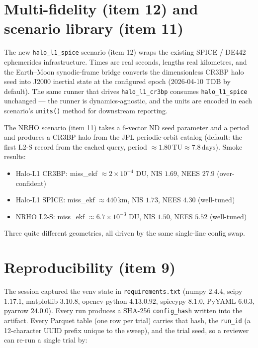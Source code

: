 \documentclass[11pt]{article}
\begin{document}
\section{Multi-fidelity (item 12) and scenario library (item 11)}

The new \texttt{halo\_l1\_spice} scenario (item 12) wraps the existing
SPICE / DE442 ephemerides infrastructure. Times are real seconds, lengths
real kilometres, and the Earth--Moon synodic-frame bridge converts the
dimensionless CR3BP halo seed into J2000 inertial state at the configured
epoch (2026-04-10 TDB by default). The same runner that drives
\texttt{halo\_l1\_cr3bp} consumes \texttt{halo\_l1\_spice} unchanged ---
the runner is dynamics-agnostic, and the units are encoded in each
scenario's \texttt{units()} method for downstream reporting.

The NRHO scenario (item 11) takes a 6-vector ND seed parameter and a
period and produces a CR3BP halo from the JPL periodic-orbit catalog
(default: the first L2-S record from the cached query, period
$\approx 1.80\,\textrm{TU} \approx 7.8\,\textrm{days}$). Smoke results:

\begin{itemize}[leftmargin=2em]
\item Halo-L1 CR3BP: miss\_ekf $\approx 2 \times 10^{-4}$ DU, NIS $1.69$, NEES $27.9$ (over-confident)
\item Halo-L1 SPICE: miss\_ekf $\approx 440\,\textrm{km}$, NIS $1.73$, NEES $4.30$ (well-tuned)
\item NRHO L2-S: miss\_ekf $\approx 6.7 \times 10^{-3}$ DU, NIS $1.50$, NEES $5.52$ (well-tuned)
\end{itemize}

\noindent
Three quite different geometries, all driven by the same single-line
config swap.

\section{Reproducibility (item 9)}

The session captured the venv state in \texttt{requirements.txt} (numpy
$2.4.4$, scipy $1.17.1$, matplotlib $3.10.8$, opencv-python $4.13.0.92$,
spiceypy $8.1.0$, PyYAML $6.0.3$, pyarrow $24.0.0$). Every run produces a
SHA-256 \texttt{config\_hash} written into the artifact. Every Parquet
table (one row per trial) carries that hash, the \texttt{run\_id} (a
12-character UUID prefix unique to the sweep), and the trial seed, so a
reviewer can re-run a single trial by:
\end{document}
